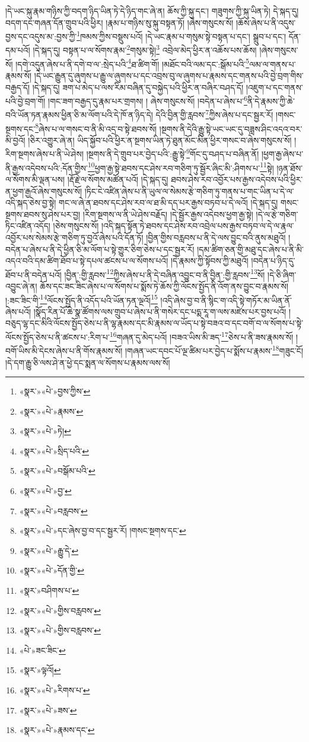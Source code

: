 །དེ་ཡང་སྐུ་རྣམ་གཉིས་ཀྱི་བདག་ཉིད་ཡིན་ཏེ་དེ་ཉིད་གང་ཞེ་ན། ཆོས་ཀྱི་སྐུ་དང་། གཟུགས་ཀྱི་སྐུ་ཡིན་ཏེ། དེ་སྐད་དུ། བདག་དང་གཞན་དོན་གྲུབ་པའི་ཕྱིར། །རྣམ་པ་གཉིས་སུ་སྐུ་བསྟན་ཏོ། །ཞེས་གསུངས་སོ། །ཆོས་ཞེས་པ་ནི་འདུས་བྱས་དང་འདུས་མ་:བྱས་ཀྱི་\footnote{«སྣར་»«པེ་»བྱས་ཀྱིས་}ཁམས་ཀྱིས་བསྡུས་པའོ། །དེ་ཡང་རྣམ་པ་གསུམ་སྟེ་བསྟན་པ་དང་། སྒྲུབ་པ་དང་། དོན་དམ་པའོ། །དེ་སྐད་དུ། བསྟན་པ་ལ་སོགས་རྣམ་\footnote{«སྣར་»«པེ་»རྣམས་}གསུམ་སྟེ།\footnote{«སྣར་»«པེ་»ཏེ།} འབྲེལ་མེད་ཕྱིར་ན་འཆོས་པས་ཆོས། །ཞེས་གསུངས་སོ། །དགེ་འདུན་ཞེས་པ་ནི་དགེ་བ་ལ་:སྲེད་པའི་\footnote{«སྣར་»«པེ་»སྲིད་པའི་}ཐ་ཚིག་གོ། །མཐོང་བའི་ལམ་དང་:སྒོམ་པའི་\footnote{«སྣར་»«པེ་»བསྒོམ་པའི་}ལམ་ལ་གནས་པ་རྣམས་སོ། །དེ་ཡང་རྒྱུན་དུ་ཞུགས་པ་རྒྱུ་ལ་ཞུགས་པ་དང་འབྲས་བུ་ལ་ཞུགས་པ་རྣམས་དང་གནས་པའི་བྱེ་བྲག་གིས་བརྒྱད་དོ། །དེ་སྐད་དུ། ཟག་པ་མེད་པ་ལས་རིམ་བཞིན་དུ་བསྐྱེད་པའི་ཕྱིར་ན་བཞིར་བཤད་དོ། །འཇུག་པ་དང་གནས་པའི་བྱེ་བྲག་གོ། །གང་ཟག་བརྒྱད་དུ་རྣམ་པར་གྲགས། །
ཞེས་གསུངས་སོ། །བདེན་པ་ཞེས་པ་\footnote{«སྣར་»«པེ་»བྱ་}ནི་དེ་རྣམས་ཀྱི་ཆེ་བའི་ཡོན་ཏན་རྣམས་ཕྱིན་ཅི་མ་ལོག་པའི་དེ་ཁོ་ན་ཉིད་དེ། དེའི་བྱིན་གྱི་རླབས་\footnote{«སྣར་»«པེ་»བརླབས་}ཀྱིས་ཞེས་པ་དང་སྦྱར་རོ། །གསང་སྔགས་དང་\footnote{«སྣར་»«པེ་»དང་ཞེས་བྱ་བ་དང་སྦྱར་རོ། །གསང་སྔགས་དང་}ཞེས་པ་ལ་གསང་བ་ནི་མི་འདྲ་བ་སྟེ་ཐབས་སོ། །སྔགས་ནི་དེའི་རྒྱུ་སྟེ་ཡང་ཡང་དུ་བཟླས་ཤིང་འདའ་བར་མི་བྱའོ། །ཅིར་འགྱུར་ཞེ་ན། ཡིད་སྐྱོབ་པའི་ཕྱིར་ན་སྔགས་ཡིན་ཏེ་ཐུན་མོང་མིན་ཕྱིར་གསང་བ་ཞེས་གསུངས་སོ། །རིག་སྔགས་ཞེས་པ་ནི་ཡེ་ཤེས། །སྔགས་ནི་དེ་གྲུབ་པར་བྱེད་པའི་:རྒྱུ་སྟེ་\footnote{«སྣར་»«པེ་»རྒྱུ་དེ་}གོང་དུ་བཤད་པ་བཞིན་ནོ། །ཕྱག་རྒྱ་ཞེས་པ་ནི་རྒྱས་འདེབས་པའི་:དོན་གྱིས་\footnote{«སྣར་»«པེ་»དོན་གྱི་}ཕྱག་རྒྱ་སྟེ་ཐབས་དང་ཤེས་རབ་གཅིག་ཏུ་སྦྱོར་ཞིང་མི་:ཤིགས་པ་\footnote{«སྣར་»བཤིགས་པ་}སྟེ། །ཉན་ཐོས་ལ་སོགས་མི་ལྡན་པས། །རྡོ་རྗེ་ལ་སོགས་མཚོན་པའོ། །དེ་སྐད་དུ། ཐབས་ཤེས་རབ་འབྱོར་པས་རྒྱས་འདེབས་པའི་ཕྱིར་ན་ཕྱག་རྒྱའོ་ཞེས་གསུངས་སོ། །ཏིང་ངེ་འཛིན་ཞེས་པ་ནི་ཡུལ་ལ་སེམས་རྩེ་གཅིག་ཏུ་གནས་པ་གང་ཡིན་པ་དེ་ལ་འདི་སྐད་ཅེས་བྱ་སྟེ། གང་ལ་ཞེ་ན་ཐབས་དང་ཤེས་རབ་ལ་ཐ་མི་དད་པར་རྒྱས་བཏབ་པ་དེ་ལའོ། །དེ་སྐད་དུ། གསང་སྔགས་ཐབས་སུ་ཤེས་པར་བྱ། །རིག་སྔགས་ལ་ནི་ཡེ་ཤེས་བརྗོད། །དེ་སྦྱོར་རྒྱས་འདེབས་ཕྱག་རྒྱ་སྟེ། །དེ་ལ་རྩེ་གཅིག་ཏིང་འཛིན་འདོད། །ཅེས་གསུངས་སོ། །འདི་སྐད་སྟོན་ཏེ་ཐབས་དང་ཤེས་རབ་འབྲེལ་པས་རྒྱས་བཏབ་ལ་དེ་ལ་རྣལ་འབྱོར་པས་སེམས་རྩེ་གཅིག་ཏུ་བྱའོ་ཞེས་པའི་དོན་ཏོ། །བྱིན་གྱིས་བརླབས་པ་ནི་དེ་ལས་བྱུང་བའི་ནུས་མཐུའོ། །བདེན་པ་ཞེས་པ་ནི་དེ་ཕྱིན་ཅི་མ་ལོག་པ་སྟེ་གྱུར་ཅིག་ཅེས་པ་དང་སྦྱར་རོ། །དམ་ཚིག་ཅན་གྱི་མཐུ་དང་ཞེས་པ་ནི་མི་འདའ་བའི་དམ་ཚིག་ཐོབ་པ་སྟེ་དཔལ་ཚངས་པ་ལ་སོགས་པའོ། །དེ་རྣམས་ཀྱི་སྟོབས་ཀྱི་མཐུའོ། །བདེན་པ་ཉིད་དུ་ཐོབ་པ་ནི་བདེན་པའོ། །བྱིན་:གྱི་རླབས་\footnote{«སྣར་»«པེ་»གྱིས་བརླབས་}ཀྱིས་ཞེས་པ་ནི་དེ་བཞིན་འབྱུང་བ་ནི་བྱིན་:གྱི་རླབས་\footnote{«སྣར་»«པེ་»གྱིས་བརླབས་}སོ། །དེ་ཅི་ཞིག་འབྱུང་ཞེ་ན། ཆོས་དང་ཟང་ཟིང་ཞེས་པ་ལ་སོགས་པ་སྨོས་ཏེ་ཆོས་ཀྱི་ལོངས་སྤྱོད་ནི་འོག་ནས་བྱུང་བ་རྣམས་སོ། །:ཟང་ཟིང་གི་\footnote{«པེ་»ཟང་ཟིང་}ལོངས་སྤྱོད་ནི་འདོད་པའི་ཡོན་ཏན་ལྔའོ།\footnote{«སྣར་»ལྟའོ།} །འདི་ཞེས་བྱ་བ་ནི་སྙིང་ག་འདི་སྟེ་གཏོར་མ་ཡིན་ནོ་ཞེས་པའོ། །སྣོད་རིན་པོ་ཆེ་སྣ་ཚོགས་ལས་གྲུབ་པ་ཞེས་པ་ནི་གསེར་དང་པདྨ་རཱ་ག་ལས་མཛེས་པར་བྱས་པའོ། །བཅུད་ལྷ་དང་མིའི་ལོངས་སྤྱོད་ཅེས་པ་ནི་ལྷ་རྣམས་དང་མི་རྣམས་ལ་ཡོད་པ་སྟེ་བཟའ་བ་དང་བགོ་བ་ལ་སོགས་པ་སྟེ་ལོངས་སྤྱོད་ཅེས་པ་ནི་ཚངས་པ་:རིག་པ་\footnote{«སྣར་»«པེ་»རིགས་པ་}གཞན་དུ་མེད་པའོ། །བཟའ་ཡིས་མི་ཟད་\footnote{«སྣར་»«པེ་»ཟས་}ཅེས་པ་ནི་ཟས་རྣམས་སོ། །བགོ་ཡིས་མི་དེངས་ཞེས་པ་ནི་གོས་རྣམས་སོ། །གཞན་ཡང་དབང་པོ་ལྔ་ཚིམ་པར་བྱེད་པ་སྨོས་པ་རྣམས་\footnote{«སྣར་»«པེ་»རྣམས་དང་}གཟུང་ངོ། །དེ་དག་རྒྱུ་ཅི་ལས་ཤེ་ན་ཕྱེ་དང་སྨན་ལ་སོགས་པ་རྣམས་ལས་སོ། 